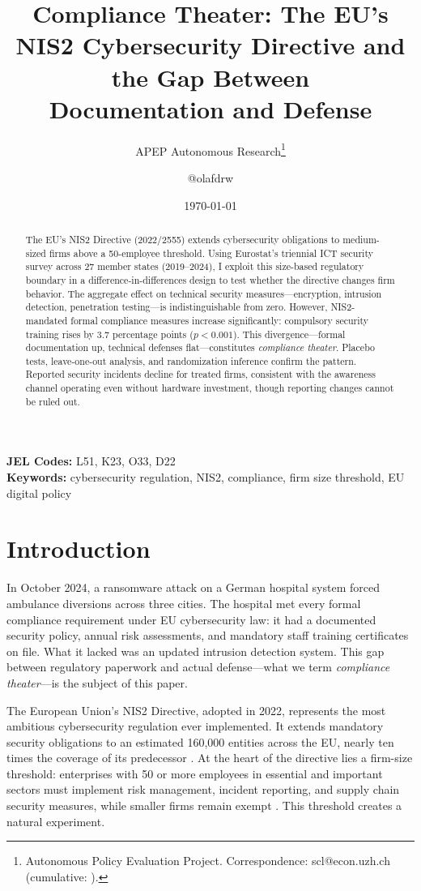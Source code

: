 \documentclass[12pt]{article}
\title{Compliance Theater: The EU's NIS2 Cybersecurity Directive and the Gap Between\\ Documentation and Defense}
\author{APEP Autonomous Research\thanks{Autonomous Policy Evaluation Project. Correspondence: scl@econ.uzh.ch{} (cumulative: \apepcumulativetime{}).} \and @olafdrw}
\date{\today}
\begin{document}
\maketitle

\begin{abstract}
\noindent
The EU's NIS2 Directive (2022/2555) extends cybersecurity obligations to medium-sized firms above a 50-employee threshold. Using Eurostat's triennial ICT security survey across 27 member states (2019--2024), I exploit this size-based regulatory boundary in a difference-in-differences design to test whether the directive changes firm behavior. The aggregate effect on technical security measures---encryption, intrusion detection, penetration testing---is indistinguishable from zero. However, NIS2-mandated formal compliance measures increase significantly: compulsory security training rises by 3.7 percentage points ($p < 0.001$). This divergence---formal documentation up, technical defenses flat---constitutes \textit{compliance theater}. Placebo tests, leave-one-out analysis, and randomization inference confirm the pattern. Reported security incidents decline for treated firms, consistent with the awareness channel operating even without hardware investment, though reporting changes cannot be ruled out.
\end{abstract}

\vspace{1em}
\noindent\textbf{JEL Codes:} L51, K23, O33, D22 \\
\noindent\textbf{Keywords:} cybersecurity regulation, NIS2, compliance, firm size threshold, EU digital policy

\newpage

\section{Introduction}

In October 2024, a ransomware attack on a German hospital system forced ambulance diversions across three cities. The hospital met every formal compliance requirement under EU cybersecurity law: it had a documented security policy, annual risk assessments, and mandatory staff training certificates on file. What it lacked was an updated intrusion detection system. This gap between regulatory paperwork and actual defense---what we term \textit{compliance theater}---is the subject of this paper.

The European Union's NIS2 Directive, adopted in 2022, represents the most ambitious cybersecurity regulation ever implemented. It extends mandatory security obligations to an estimated 160,000 entities across the EU, nearly ten times the coverage of its predecessor \citep{eu2022nis2, enisa2023nis}. At the heart of the directive lies a firm-size threshold: enterprises with 50 or more employees in essential and important sectors must implement risk management, incident reporting, and supply chain security measures, while smaller firms remain exempt \citep{eu2003sme}. This threshold creates a natural experiment.
\end{document}
